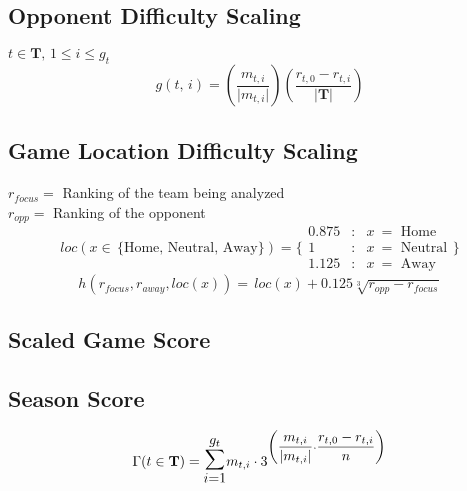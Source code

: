 \documentclass[onecolumn,fleqn,leqno]{article}
\begin{document}
	\subsection{Opponent Difficulty Scaling}
	$t \in \mathbf{T},\, 1 \leq i \leq g_t $
	\begin{equation*}
		g(t,\,i)= \left(\frac{m_{t,i}}{\lvert m_{t,i}\rvert}\right)
			\left(\frac{r_{t,0}-r_{t,i}}{\lvert\mathbf{T}\rvert}\right)
	\end{equation*}
	
	\subsection{Game Location Difficulty Scaling}
	$r_{focus}=$ Ranking of the team being analyzed \\
	$r_{opp}=$ Ranking of the opponent
	\begin{equation*}
		loc(x \in\,\text{\{Home, Neutral, Away\}})=\Biggl\{
			\begin{matrix}
				0.875 &: &x\:=\text{ Home} \\
				1 &: &x\:=\text{ Neutral} \\
				1.125 &: &x\:=\text{ Away}
			\end{matrix}			
		\Biggr\}
	\end{equation*}
	\begin{equation*}
		h(r_{focus}, r_{away}, loc(x))= \,loc(x)+0.125\sqrt[3]{r_{opp}-r_{focus}}
	\end{equation*}
	\subsection{Scaled Game Score}
	\subsection{Season Score}
	\begin{equation}
		\Gamma(t \in \mathbf{T})=
		\mathlarger{\mathlarger{\mathlarger{\sum}}_{i=1}^{g_t}}
		m_{t,i}\cdot
		3^{
			\biggl(\dfrac{m_{t,i}}{\lvert m_{t,i}\rvert}
			\cdot\dfrac{r_{t,0}-r_{t,i}}{n}\biggr)
		}
	\end{equation}
\end{document}
